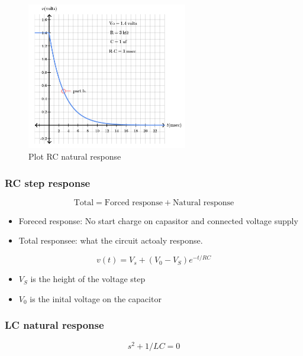 \begin{figure}[h]
    \centering
    \includegraphics[width=7cm]{image/plot_RC_natural_response.png}
    \caption{Plot RC natural response}
\end{figure}

\newpage
\subsubsection{RC step response}
\begin{equation}
    \text{Total} = \text{Forced response} + \text{Natural response} 
\end{equation}
\begin{itemize}
    \item Foreced response: No start charge on capasitor and connected voltage supply
    \item Total responsee: what the circuit actoaly response.
\end{itemize}

\begin{equation}
  v(t) = V_s + (V_0-V_S)e^{-t/RC}
\end{equation}
\begin{itemize}
    \item $V_S$ is the height of the voltage step
    \item $V_0$ is the inital voltage on the capacitor
\end{itemize}

\subsubsection{LC natural response}
\begin{equation}
  s^2 + 1/LC = 0
\end{equation}

